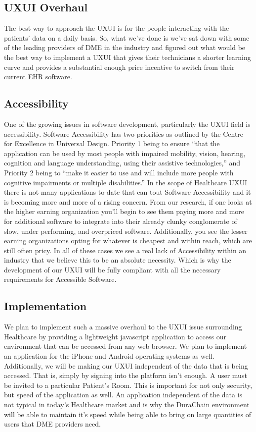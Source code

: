 \documentclass[letterpaper]{article}
\begin{document}
\subsection{UXUI Overhaul}
The best way to approach the UXUI is for the people interacting with the patients' data on a daily basis. So, what we’ve done is we’ve sat down with some of the leading providers of DME in the industry and figured out what would be the best way to implement a UXUI that gives their technicians a shorter learning curve and provides a substantial enough price incentive to switch from their current EHR software.
%
\subsection{Accessibility}
One of the growing issues in software development, particularly the UXUI field is accessibility. Software Accessibility has two priorities as outlined by the Centre for Excellence in Universal Design. Priority 1 being to ensure “that the application can be used by most people with impaired mobility, vision, hearing, cognition and language understanding, using their assistive technologies,” and Priority 2 being to “make it easier to use and will include more people with cognitive impairments or multiple disabilities.” In the scope of Healthcare UXUI there is not many applications to-date that can tout Software Accessibility and it is becoming more and more of a rising concern. From our research, if one looks at the higher earning organization you’ll begin to see them paying more and more for additional software to integrate into their already clunky conglomerate of slow, under performing, and overpriced software. Additionally, you see the lesser earning organizations opting for whatever is cheapest and within reach, which are still often pricy. In all of these cases we see a real lack of Accessibility within an industry that we believe this to be an absolute necessity. Which is why the development of our UXUI will be fully compliant with all the necessary requirements for Accessible Software.
%
\subsection{Implementation}
We plan to implement such a massive overhaul to the UXUI issue surrounding Healthcare by providing a lightweight javascript application to access our environment that can be accessed from any web browser. We plan to implement an application for the iPhone and Android operating systems as well. Additionally, we will be making our UXUI independent of the data that is being accessed. That is, simply by signing into the platform isn’t enough. A user must be invited to a particular Patient’s Room. This is important for not only security, but speed of the application as well. An application independent of the data is not typical in today’s Healthcare market and is why the DuraChain environment will be able to maintain it’s speed while being able to bring on large quantities of users that DME providers need.
%
\end{document}
